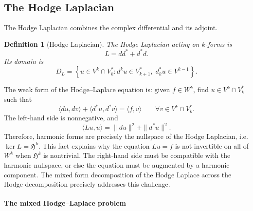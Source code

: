 \documentclass{article}
\newtheorem{definition}{Definition}[section]
\DeclareMathOperator{\grad}{grad}
\DeclareMathOperator{\curl}{curl}
\DeclareMathOperator{\divergence}{div}
\newcommand{\f}[1]{\mathfrak{#1}}
\begin{document}

\subsection{The Hodge Laplacian}

The Hodge Laplacian combines the complex differential and its adjoint.

\begin{definition}[Hodge Laplacian]\label{def:hodge-laplacian-expanded}
	The Hodge Laplacian acting on $k$-forms is
\[		L
		=
		d d^*
		+
		d^* d.
	\]
    Its domain is
	\[	D_L
		=
		\left\{
			u\in V^k\cap V_k^*
			:
			d^k u\in V_{k+1}^*,
			\;
			d_k^*u\in V^{k-1}
		\right\}.
	\]
\end{definition}

The weak form of the Hodge--Laplace equation is: given $f\in W^k$, find
$u\in V^k\cap V_k^*$ such that
\[	\langle d u,d v\rangle
	+
	\langle d^*u,d^*v\rangle
	=
	\langle f,v\rangle
	\qquad
	\forall v\in V^k\cap V_k^*.
\]
The left-hand side is nonnegative, and
\[	\langle L u,u\rangle
	=
	\|du\|^2+\|d^*u\|^2.
\]
Therefore, harmonic forms are precisely the nullspace of the Hodge Laplacian, i.e. $\ker L
	=
	\f H^k$. This
fact explains why the equation $Lu=f$ is not invertible on all of $W^k$ when
$\f H^k$ is nontrivial.  The right-hand side must be compatible with the
harmonic nullspace, or else the equation must be augmented by a harmonic
component. The mixed form decomposition of the Hodge Laplace across the Hodge decomposition precisely addresses this challenge. 


\paragraph{The mixed Hodge--Laplace problem}
\end{document}
